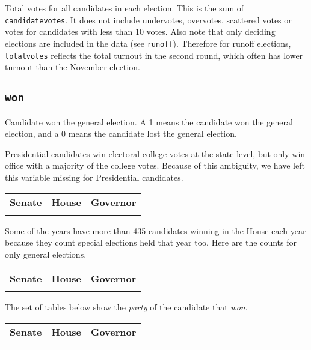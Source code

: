 \documentclass[12pt]{article}
\begin{document}
Total votes for all candidates in each election. This is the sum of \texttt{candidatevotes}. It does not include undervotes, overvotes, scattered votes or votes for candidates with less than 10 votes.  Also note that only deciding elections are included in the data (see \texttt{runoff}). Therefore for runoff elections, \texttt{totalvotes} reflects the total turnout in the second round, which often has lower turnout than the November election.



\subsection*{\texttt{won}} 
Candidate won the general election. A 1 means the candidate won the general election, and a 0 means the candidate lost the general election. 

Presidential candidates win electoral college votes at the state level, but only win office with a majority of the college votes. Because of this ambiguity, we have left this variable missing for Presidential candidates.

    \begin{tabularx}{\linewidth}{CCC}
    \textbf{Senate} & \textbf{House} & \textbf{Governor}\\
     &  & 
    \end{tabularx}

Some of the years have more than 435 candidates winning in the House each year because they count special elections held that year too. Here are the counts for only general elections.

\begin{tabularx}{\linewidth}{CCC}
    \textbf{Senate} & \textbf{House} & \textbf{Governor}\\
     &  & 
    \end{tabularx}


The set of tables below show the \emph{party} of the candidate that \emph{won}. 

    \begin{tabularx}{\linewidth}{CCC}
    \textbf{Senate} & \textbf{House} & \textbf{Governor}\\
     &  & 
    \end{tabularx}
\end{document}
